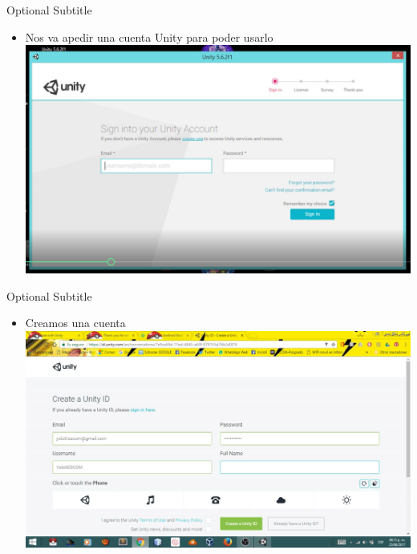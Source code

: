 \documentclass{beamer}
\begin{document}
\begin{frame}{05}{Optional Subtitle}
  \begin{itemize}
  \item {
    Nos va apedir una cuenta Unity para poder usarlo
  }
  \includegraphics[width=\linewidth]{image/IU05}

  \end{itemize}
\end{frame}

\begin{frame}{06}{Optional Subtitle}
  \begin{itemize}
  \item {
    Creamos una cuenta
  }
  \includegraphics[width=\linewidth]{image/IU06}

  \end{itemize}
\end{frame}
\end{document}
